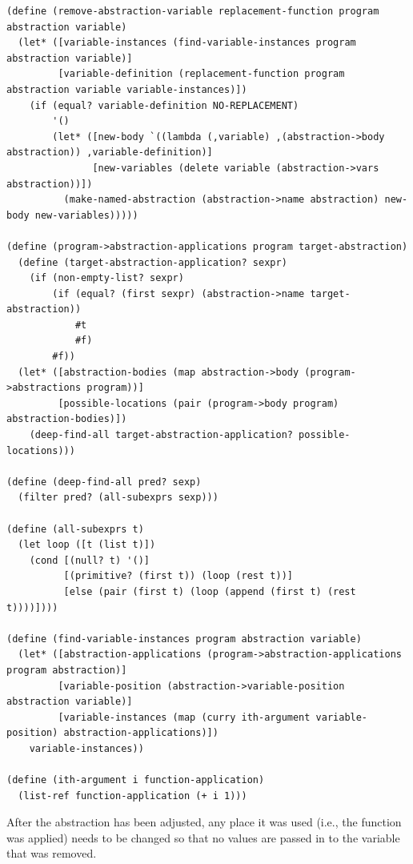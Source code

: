 \documentclass[a4paper,10pt]{article}
\begin{document}
\begin{lstlisting}[frame=trBL]
(define (remove-abstraction-variable replacement-function program abstraction variable)
  (let* ([variable-instances (find-variable-instances program abstraction variable)]
         [variable-definition (replacement-function program abstraction variable variable-instances)])
    (if (equal? variable-definition NO-REPLACEMENT)
        '()
        (let* ([new-body `((lambda (,variable) ,(abstraction->body abstraction)) ,variable-definition)]
               [new-variables (delete variable (abstraction->vars abstraction))])
          (make-named-abstraction (abstraction->name abstraction) new-body new-variables)))))

(define (program->abstraction-applications program target-abstraction)
  (define (target-abstraction-application? sexpr)
    (if (non-empty-list? sexpr)
        (if (equal? (first sexpr) (abstraction->name target-abstraction))
            #t
            #f)
        #f))
  (let* ([abstraction-bodies (map abstraction->body (program->abstractions program))]
         [possible-locations (pair (program->body program) abstraction-bodies)])
    (deep-find-all target-abstraction-application? possible-locations)))

(define (deep-find-all pred? sexp)
  (filter pred? (all-subexprs sexp)))

(define (all-subexprs t)
  (let loop ([t (list t)])
    (cond [(null? t) '()]
          [(primitive? (first t)) (loop (rest t))]
          [else (pair (first t) (loop (append (first t) (rest t))))])))

(define (find-variable-instances program abstraction variable)
  (let* ([abstraction-applications (program->abstraction-applications program abstraction)]
         [variable-position (abstraction->variable-position abstraction variable)]
         [variable-instances (map (curry ith-argument variable-position) abstraction-applications)])
    variable-instances))

(define (ith-argument i function-application)
  (list-ref function-application (+ i 1)))

\end{lstlisting}
After the abstraction has been adjusted, any place it was used (i.e., the function was applied) needs to be changed so that no values are passed in to the variable that was removed.
\end{document}
